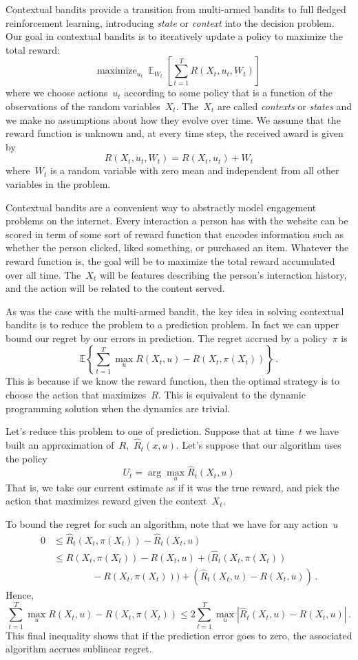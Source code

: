 \documentclass{tufte-book}
\begin{document}

Contextual bandits provide a transition from multi-armed bandits to full
fledged reinforcement learning, introducing \emph{state} or
\emph{context} into the decision problem. Our goal in contextual bandits
is to iteratively update a policy to maximize the total reward: \[
    \text{maximize}_{u_t}~\mathop\mathbb{E}_{W_t}\left[\sum_{t=1}^T R(X_t,u_t,W_t)\right]
\] where we choose actions~\(u_t\) according to some policy that is a
function of the observations of the random variables~\(X_t\).
The~\(X_t\) are called \emph{contexts} or \emph{states} and we make no
assumptions about how they evolve over time. We assume that the reward
function is unknown and, at every time step, the received award is given
by \[
R(X_t,u_t,W_t)=R(X_t,u_t)+W_t
\] where~\(W_t\) is a random variable with zero mean and independent
from all other variables in the problem.

Contextual bandits are a convenient way to abstractly model engagement
problems on the internet. Every interaction a person has with the
website can be scored in term of some sort of reward function that
encodes information such as whether the person clicked, liked something,
or purchased an item. Whatever the reward function is, the goal will be
to maximize the total reward accumulated over all time. The~\(X_t\) will
be features describing the person's interaction history, and the action
will be related to the content served.

As was the case with the multi-armed bandit, the key idea in solving
contextual bandits is to reduce the problem to a prediction problem. In
fact we can upper bound our regret by our errors in prediction. The
regret accrued by a policy~\(\pi\) is \[
    \mathbb{E}\left\{\sum_{t=1}^T  \max_{u} R(X_t,u) - R(X_t, \pi(X_t)) \right\}\,.
\] This is because if we know the reward function, then the optimal
strategy is to choose the action that maximizes~\(R\). This is
equivalent to the dynamic programming solution when the dynamics are
trivial.

Let's reduce this problem to one of prediction. Suppose that at
time~\(t\) we have built an approximation of~\(R\),~\(\hat{R}_t(x,u)\).
Let's suppose that our algorithm uses the policy \[
    U_t = \arg \max_u \hat{R}_t(X_t,u)
\] That is, we take our current estimate as if it was the true reward,
and pick the action that maximizes reward given the context~\(X_t\).

To bound the regret for such an algorithm, note that we have for any
action~\(u\) \[
\begin{aligned}
    0 &\leq \hat{R}_t(X_t,\pi(X_t))-\hat{R}_t(X_t, u)\\
     &\leq R(X_t, \pi(X_t))-R(X_t, u) + (\hat{R}_t(X_t,\pi(X_t)) \\
     &\qquad\qquad- R(X_t, \pi(X_t) ))
     + (\hat{R}_t(X_t,u) - R(X_t, u ) )\,.   
\end{aligned}
\] Hence, \[
    \sum_{t=1}^T  \max_{u} R(X_t,u) - R(X_t, \pi(X_t))
    \leq 2 \sum_{t=1}^T \max_u | \hat{R}_t(X_t, u)-R(X_t, u)|\,.
\] This final inequality shows that if the prediction error goes to
zero, the associated algorithm accrues sublinear regret.
\end{document}
